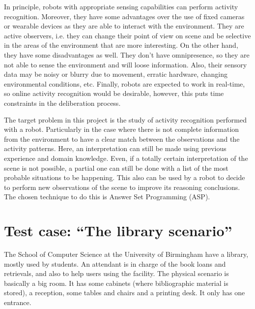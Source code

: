In principle, robots with appropriate sensing capabilities can perform activity recognition. 
Moreover, they have some advantages over the use of fixed cameras or wearable devices as they are able to interact with the environment. 
They are active observers, i.e. they can change their point of view on scene and be selective in the areas of the environment that are more interesting. 
On the other hand, they have some disadvantages as well. 
They don't have omnipresence, so they are not able to sense the environment and will loose information. 
Also, their sensory data may be noisy or blurry due to movement, erratic hardware, changing environmental conditions, etc. 
Finally, robots are expected to work in real-time, so online activity recognition would be desirable, however, this puts time constraints in the deliberation process.


The target problem in this project is the study of activity recognition performed with a robot. 
Particularly in the case where there is not complete information from the environment to have a clear match between the observations and the activity patterns. 
Here, an interpretation can still be made using previous experience and domain knowledge. 
Even, if a totally certain interpretation of the scene is not possible, a partial one can still be done with a list of the most probable situations to be happening. 
This also can be used by a robot to decide to perform new observations of the scene to improve its reasoning conclusions. 
The chosen technique to do this is Answer Set Programming (ASP).



\section{Test case: ``The library scenario''} %

The School of Computer Science at the University of Birmingham have a library, mostly used by students.
An attendant is in charge of the book loans and retrievals, and also to help users using the facility.
The physical scenario is basically a big room. It has some cabinets (where bibliographic material is stored), a reception, some tables and chairs and a printing desk. It only has one entrance. 


